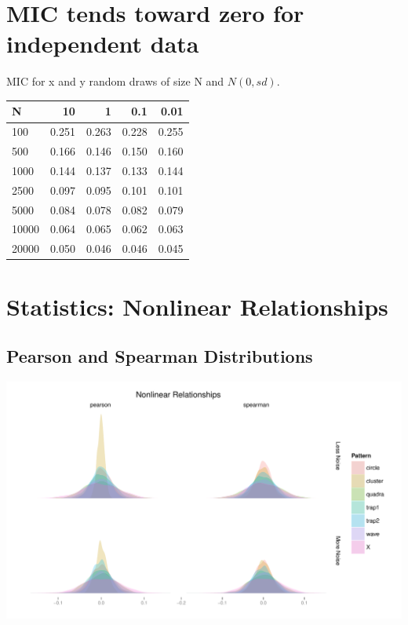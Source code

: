 \documentclass[english,nohyper,titlepage]{tufte-handout}\usepackage{graphicx, color}
\begin{document}
\vspace{2.5cm}
\section{MIC tends toward zero for independent data}\label{sec:MICN0}
MIC for x and y random draws of size N and $N(0, sd)$.\\

\footnotesize{
\begin{tabular}{lrrrr}
N  & 10 & 1 & 0.1 & 0.01 \\
\hline
100 & 0.251 & 0.263 & 0.228 & 0.255 \\
500 & 0.166 & 0.146 & 0.150 & 0.160 \\
1000 & 0.144 & 0.137 & 0.133 & 0.144 \\
2500 & 0.097 & 0.095 & 0.101 & 0.101 \\
5000 & 0.084 & 0.078 & 0.082 & 0.079 \\
10000 & 0.064 & 0.065 & 0.062 & 0.063 \\
20000 & 0.050 & 0.046 & 0.046 & 0.045 \\
\hline
\end{tabular}
}


\section{Statistics: Nonlinear Relationships}\label{sec:nonlinrel}
\subsection{Pearson and Spearman Distributions}
\includegraphics[scale=.5]{images/NonlinearDensitiespearsonspearman}
\end{document}
